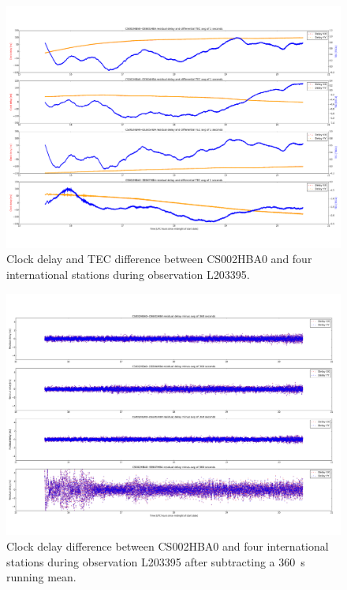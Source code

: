 \documentclass[a4paper,twoside, 10pt]{report}
\begin{document}
\begin{figure}
  \begin{center}
    \includegraphics[width=\columnwidth]{L203421-EU-clock-tec.png}
  \end{center}
  \caption{Clock delay and TEC difference between CS002HBA0 and four
    international stations during observation L203395.}
  \label{fig:clock-tec-eu}
\end{figure}


\begin{figure}
  \begin{center}
    \includegraphics[width=\columnwidth]{L203421-EU-scatter-around-360s-avg.png}
  \end{center}
  \caption{Clock delay difference between CS002HBA0 and four
    international stations during observation L203395 after
    subtracting a 360~s running mean.}
  \label{fig:clock-tec-eu-minus-360-avg}
\end{figure}
\end{document}
